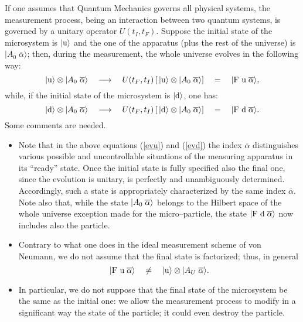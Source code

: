 \documentclass[10pt,a4paper]{article}
\begin{document}
If one assumes that Quantum Mechanics governs all physical
systems, the measurement process, being an interaction between two
quantum systems, is governed by a unitary operator $U(t_{I},
t_{F})$. Suppose the initial state of the microsystem is
$|\makebox{u}\rangle$ and the one of the apparatus (plus the rest
of the universe) is $|A_{0}\; \overline{\alpha}\rangle$; then,
during the measurement, the whole universe evolves in the
following way:
\begin{equation} \label{evu}
|\makebox{u}\rangle\otimes|\makebox{$A_{0}$}\; \overline{\alpha}
\rangle \quad \longrightarrow \quad U(t_{F}, t_{I})\left[\,
|\makebox{u}\rangle\otimes| \makebox{$A_{0}$}\; \overline{\alpha}
\rangle \right]\quad =\quad |\makebox{F u}\; \overline{\alpha}
\rangle,
\end{equation}
while, if the initial state of the microsystem is
$|\makebox{d}\rangle$,  one has:
\begin{equation} \label{evd}
|\makebox{d}\rangle\otimes|\makebox{$A_{0}$}\; \overline{\alpha}
\rangle \quad \longrightarrow \quad U(t_{F}, t_{I})\left[\,
|\makebox{d}\rangle\otimes| \makebox{$A_{0}$}\; \overline{\alpha}
\rangle \right]\quad =\quad |\makebox{F d}\; \overline{\alpha}
\rangle.
\end{equation}
Some comments are needed.
\begin{itemize}
\item Note that in the above equations (\ref{evu}) and (\ref{evd})
the index $\overline{\alpha}$ distinguishes various possible and
uncontrollable situations of the measuring apparatus in its
``ready'' state. Once the initial state is fully specified also
the final one, since the evolution is unitary, is perfectly and
unambiguously determined. Accordingly, such a state is
appropriately characterized by the same index $\overline{\alpha}$.
Note also that, while the state $|\makebox{$A_{0}$}\;
\overline{\alpha} \rangle$ belongs to the Hilbert space of the
whole universe exception made for the micro--particle, the state
$|\makebox{F d}\; \overline{\alpha}\rangle$ now includes also the
particle.

\item Contrary to what one does in the ideal measurement
scheme of von Neumann, we do not assume that  the final state is
factorized; thus, in general
\[ |\makebox{F u}\; \overline{\alpha} \rangle \quad \neq \quad
|\makebox{u}\rangle \otimes |A_{U}\; \overline{\alpha}\rangle.
\]
\item In particular, we do not suppose that the final state of the
microsystem be the same as the initial one: we allow the
measurement process to modify in a significant way the state of
the particle; it could even destroy the particle.
\end{itemize}
\end{document}
